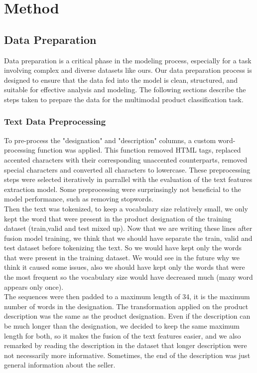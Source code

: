 \chapter{Method}
\label{sec:method}

\section{Data Preparation}
Data preparation is a critical phase in the modeling process, especially for a task involving complex and diverse datasets like ours. Our data preparation process is designed to ensure that the data fed into the model is clean, structured, and suitable for effective analysis and modeling. The following sections describe the steps taken to prepare the data for the multimodal product classification task.

\subsection{Text Data Preprocessing}

To pre-process the "designation" and "description" columns, a custom word-processing function was applied. This function removed HTML tags, replaced accented characters with their corresponding unaccented counterparts, removed special characters and converted all characters to lowercase. These preprocessing steps were selected iteratively in parrallel with the evaluation of the text features extraction model. Some preprocessing were surprinsingly not beneficial to the model performance, such as removing stopwords.\\

Then the text was tokenized, to keep a vocabulary size relatively small, we only kept the word that were present in the product designation of the training dataset (train,valid and test mixed up).
Now that we are writing these lines after fusion model training, we think that we should have separate the train, valid and test dataset before tokenizing the text. So we would have kept only the words that were present in the training dataset. We would see in the future why we think it caused some issues, also we should have kept only the words that were the most frequent so the vocabulary size would have decreased much (many word appears only once).\\

The sequences were then padded to a maximum length of 34, it is the maximum number of words in the designation. The transformation applied on the product description was the same as the product designation. Even if the description can be much longer than the designation, we decided to keep the same maximum length for both, so it makes the fusion of the text features easier, and we also remarked by reading the description in the dataset that longer description were not necessarily more informative. Sometimes, the end of the description was just general information about the seller.\\

